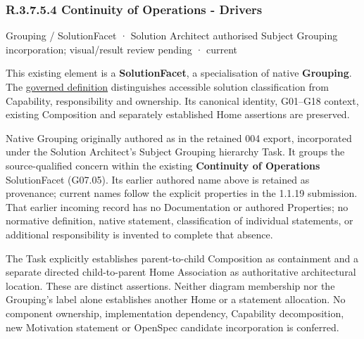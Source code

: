 \subsubsection*{R.3.7.5.4 Continuity of Operations - Drivers}
\label{navigation:R.3.7.5.4}

\label{element:f812d4f33612403986c174602b358a2f}
{\small Grouping / SolutionFacet · Solution Architect authorised Subject Grouping incorporation; visual/result review pending · current}\par

This existing element is a \textbf{SolutionFacet}, a specialisation of native
\textbf{Grouping}. The \href{\detokenize{../../../../../../../governance/continuum-representation.md#solutionfacet-classification--1119-candidate}}{governed definition}
distinguishes accessible solution classification from Capability, responsibility
and ownership. Its canonical identity, G01–G18 context, existing Composition
and separately established Home assertions are preserved.



Native Grouping originally authored as \texttt{} in the retained 004 export,
incorporated under the Solution Architect's Subject Grouping hierarchy Task.
It groups the source-qualified \texttt{} concern within
the existing \textbf{Continuity of Operations} SolutionFacet (G07.05). Its earlier authored name above is retained as provenance; current names
follow the explicit properties in the 1.1.19 submission.
That earlier incoming record has no Documentation or authored Properties; no normative
definition, native statement, classification of individual statements, or
additional responsibility is invented to complete that absence.



The Task explicitly establishes parent-to-child Composition as containment and
a separate directed child-to-parent Home Association as authoritative architectural
location. These are distinct assertions. Neither diagram membership nor the
Grouping's label alone establishes another Home or a statement allocation.
No component ownership, implementation dependency, Capability decomposition,
new Motivation statement or OpenSpec candidate incorporation is conferred.



